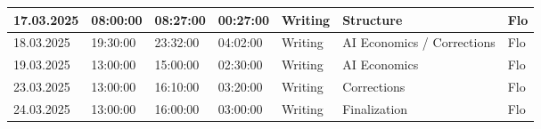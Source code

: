\begin{longtable}{@{}p{1.8cm} p{1.2cm} p{1.2cm} p{1.2cm} p{2cm} p{4.5cm} p{2cm}@{}}
    \hline
    17.03.2025   & 08:00:00 & 08:27:00 & 00:27:00 & Writing & Structure & Flo \\
    \hline
    18.03.2025   & 19:30:00 & 23:32:00 & 04:02:00 & Writing & AI Economics / Corrections & Flo \\
    \hline
    19.03.2025   & 13:00:00 & 15:00:00 & 02:30:00 & Writing & AI Economics & Flo \\
    \hline
    23.03.2025   & 13:00:00 & 16:10:00 & 03:20:00 & Writing & Corrections & Flo \\
    \hline
    24.03.2025   & 13:00:00 & 16:00:00 & 03:00:00 & Writing & Finalization & Flo \\
    \hline

    


\end{longtable}

